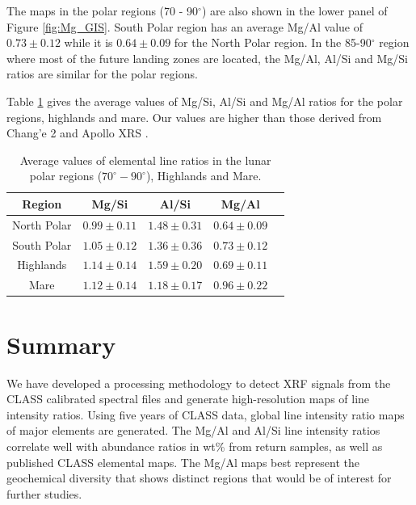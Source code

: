 \documentclass[twocolumn]{aastex631}
\begin{document}
The maps in the polar regions (70 - 90$^\circ$) are also shown in the lower panel of Figure \ref{fig:Mg_GIS}.  South Polar region has an average Mg/Al value of $0.73 \pm 0.12$ while it is $0.64 \pm 0.09$ for the North Polar region. In the 85-90$^\circ$ region where most of the future landing zones are located, the Mg/Al, Al/Si and Mg/Si ratios are similar for the polar regions. 

Table \ref{tab:average} gives the average values of Mg/Si, Al/Si and Mg/Al ratios for the polar regions, highlands and mare. Our values are higher than those derived from Chang'e 2 \citep{2016RAA....16....4D} and Apollo XRS \citep{Gloudermans2021}. 

  \begin{table}[h]
    \centering
    \begin{tabular}{|c|c|c|c|c|}
        \hline
        Region & Mg/Si& Al/Si& Mg/Al\\ \hline
        North Polar   & $0.99 \pm 0.11$ & $1.48 \pm 0.31$   & $0.64 \pm 0.09$ \\ \hline
        South Polar   & $1.05 \pm 0.12$   & $1.36 \pm 0.36$   & $0.73 \pm 0.12$ \\ \hline
        Highlands & $1.14 \pm 0.14$ & $1.59 \pm 0.20$ & $0.69 \pm 0.11$ \\ \hline
        Mare & $1.12 \pm 0.14$ & $1.18 \pm 0.17$ & $0.96 \pm 0.22$ \\ \hline
    \end{tabular}
    \caption{Average values of elemental line ratios in the lunar polar regions ($70^\circ-90^\circ$), Highlands and Mare.}
    \label{tab:average}
\end{table}

\section{Summary}
We have developed a processing methodology to detect XRF signals from the CLASS calibrated spectral files and generate high-resolution maps of line intensity ratios. Using five years of CLASS data, global line intensity ratio maps of major elements are generated. The Mg/Al and Al/Si line intensity ratios correlate well with abundance ratios in wt\% from return samples, as well as published CLASS elemental maps.  The Mg/Al maps best represent the geochemical diversity that shows distinct regions that would be of interest for further studies. 




\end{document}
